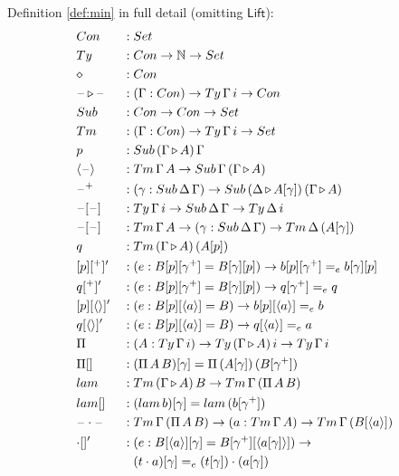 \documentclass[a4paper,UKenglish,cleveref, autoref, thm-restate]{lipics-v2021}
\newcommand{\ra}{\rightarrow}
\newcommand{\Set}{\mathsf{Set}}
\newcommand{\Ty}{\mathsf{Ty}}
\newcommand{\Tm}{\mathsf{Tm}}
\newcommand{\Con}{\mathsf{Con}}
\newcommand{\Sub}{\mathsf{Sub}}
\newcommand{\p}{\mathsf{p}}
\newcommand{\q}{\mathsf{q}}
\newcommand{\ext}{\mathop{\triangleright}}
\newcommand{\N}{\mathbb{N}}
\newcommand{\lam}{\mathsf{lam}}
\newcommand{\blank}{\mathord{\hspace{1pt}\text{--}\hspace{1pt}}} %
\newcommand{\Lift}{\mathsf{Lift}}
\begin{document}
Definition \ref{def:min} in full detail (omitting $\Lift$):
\begin{alignat*}{10}
  & \Con && : \Set \\
  & \Ty && : \Con\ra\N\ra\Set \\
  & \diamond && : \Con \\
  & \blank\ext\blank && : (\Gamma:\Con)\ra\Ty\,\Gamma\,i\ra\Con \\
  & \Sub && : \Con\ra\Con\ra\Set \\
  & \Tm && : (\Gamma:\Con)\ra\Ty\,\Gamma\,i\ra\Set \\
  & \p && : \Sub\,(\Gamma\ext A)\,\Gamma \\
  & \langle\blank\rangle && : \Tm\,\Gamma\,A\ra\Sub\,\Gamma\,(\Gamma\ext A) \\
  & \blank^+ && : (\gamma:\Sub\,\Delta\,\Gamma)\ra\Sub\,(\Delta\ext A[\gamma])\,(\Gamma\ext A) \\
  & \blank[\blank] && : \Ty\,\Gamma\,i\ra\Sub\,\Delta\,\Gamma\ra\Ty\,\Delta\,i \\
  & \blank[\blank] && : \Tm\,\Gamma\,A\ra(\gamma:\Sub\,\Delta\,\Gamma)\ra\Tm\,\Delta\,(A[\gamma]) \\
  & \q && : \Tm\,(\Gamma\ext A)\,(A[\p]) \\
  & [\p][^+]' && : (e:B[\p][\gamma^+] = B[\gamma][\p])\ra b[\p][\gamma^+] =_e b[\gamma][\p] \\
  & \q[^+]' && : (e:B[\p][\gamma^+] = B[\gamma][\p])\ra \q[\gamma^+] =_e \q \\
  & [\p][\langle\rangle]' && : (e:B[\p][\langle a\rangle] = B)\ra b[\p ][\langle a\rangle] =_e b \\
  & \q[\langle\rangle]' && : (e:B[\p][\langle a\rangle] = B)\ra \q[\langle a\rangle] =_e a \\
  & \Pi && : (A:\Ty\,\Gamma\,i)\ra\Ty\,(\Gamma\ext A)\,i\ra\Ty\,\Gamma\,i \\
  & \Pi[] && : (\Pi\,A\,B)[\gamma] = \Pi\,(A[\gamma])\,(B[\gamma^+]) \\
  & \lam && : \Tm\,(\Gamma\ext A)\,B\ra\Tm\,\Gamma\,(\Pi\,A\,B) \\
  & \lam[] && : (\lam\,b)[\gamma] = \lam\,(b[\gamma^+]) \\
  & \blank\cdot\blank && : \Tm\,\Gamma\,(\Pi\,A\,B)\ra(a:\Tm\,\Gamma\,A)\ra\Tm\,\Gamma\,(B[\langle a\rangle]) \\
  & {\cdot}[]' && : (e:B[\langle a\rangle][\gamma] = B[\gamma^+][\langle a[\gamma]\rangle])\ra \\
  & && \hphantom{{}:{}} (t\cdot a)[\gamma] =_e (t[\gamma])\cdot(a[\gamma]) \\

\end{alignat*}
\end{document}
